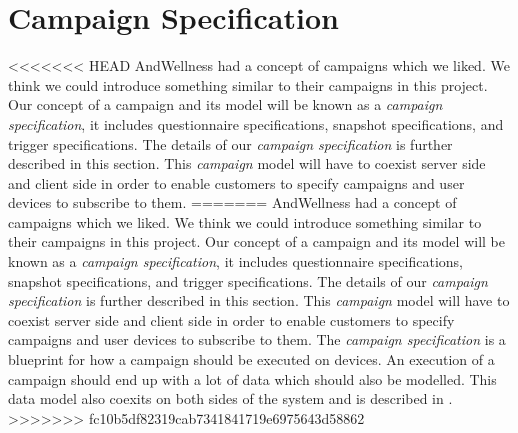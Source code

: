 
\section{Campaign Specification}
\label{sec:campaign_specification}
<<<<<<< HEAD
AndWellness had a concept of campaigns  which we liked. We think we could introduce something similar to their campaigns in this project. Our concept of a campaign and its model will be known as a \textit{campaign specification}, it includes questionnaire specifications, snapshot specifications, and trigger specifications. The details of our \textit{campaign specification} is further described in this section. This \textit{campaign} model will have to coexist server side and client side in order to enable customers to specify campaigns and user devices to subscribe to them.  
=======
AndWellness had a concept of campaigns  which we liked. We think we could introduce something similar to their campaigns in this project. Our concept of a campaign and its model will be known as a \textit{campaign specification}, it includes questionnaire specifications, snapshot specifications, and trigger specifications. The details of our \textit{campaign specification} is further described in this section. This \textit{campaign} model will have to coexist server side and client side in order to enable customers to specify campaigns and user devices to subscribe to them. The \textit{campaign specification} is a blueprint for how a campaign should be executed on devices. An execution of a campaign should end up with a lot of data which should also be modelled. This data model also coexits on both sides of the system and is described in .
>>>>>>> fc10b5df82319cab7341841719e6975643d58862

